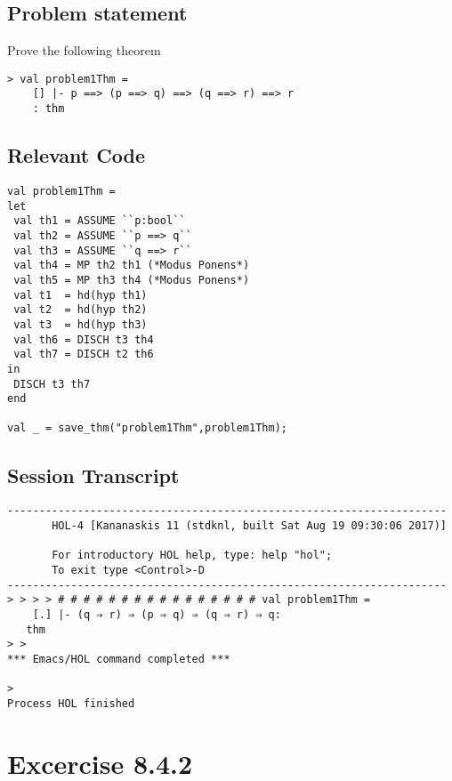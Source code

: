 \documentclass{report}
\begin{document}
\section{Problem statement}
\label{problem-statement-8-4-1}
Prove the following theorem
\begin{lstlisting}[frame=tblr]
> val problem1Thm =
	[] |- p ==> (p ==> q) ==> (q ==> r) ==> r
	: thm
\end{lstlisting}

\section{Relevant Code}
\label{rel-code-8-4-1}
\begin{lstlisting}[frame=TBlr]
val problem1Thm =
let
 val th1 = ASSUME ``p:bool``
 val th2 = ASSUME ``p ==> q``
 val th3 = ASSUME ``q ==> r``
 val th4 = MP th2 th1 (*Modus Ponens*)
 val th5 = MP th3 th4 (*Modus Ponens*)
 val t1  = hd(hyp th1)
 val t2  = hd(hyp th2)
 val t3  = hd(hyp th3)
 val th6 = DISCH t3 th4
 val th7 = DISCH t2 th6
in
 DISCH t3 th7
end

val _ = save_thm("problem1Thm",problem1Thm);

\end{lstlisting}

\section{Session Transcript}
\label{trans-8-4-1}

\begin{session}
  \begin{scriptsize}
\begin{verbatim}
---------------------------------------------------------------------
       HOL-4 [Kananaskis 11 (stdknl, built Sat Aug 19 09:30:06 2017)]

       For introductory HOL help, type: help "hol";
       To exit type <Control>-D
---------------------------------------------------------------------
> > > > # # # # # # # # # # # # # # # # val problem1Thm =
    [.] |- (q ⇒ r) ⇒ (p ⇒ q) ⇒ (q ⇒ r) ⇒ q:
   thm
> > 
*** Emacs/HOL command completed ***

> 
Process HOL finished

\end{verbatim}
  \end{scriptsize}
\end{session}


\chapter{Excercise 8.4.2}
\label{cha:8.4.2}
\end{document}
